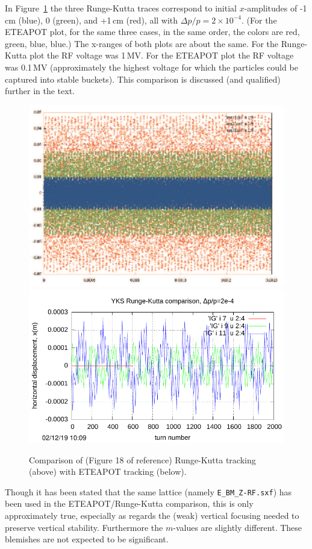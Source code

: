 \documentclass[12]{article}
\begin{document}
In Figure~\ref{fig:YKS-ETEAPOT-compare}
the three Runge-Kutta traces correspond
to initial $x$-amplitudes of -1\,cm (blue), 0 (green), and 
+1\,cm (red), all with $\Delta p/p=2\times10^{-4}$. 
(For the ETEAPOT plot, for the same three cases, in the same order, the 
colors are red, green, blue, blue.)
The x-ranges 
of both plots are about the same. For the Runge-Kutta plot
the RF voltage was 1\,MV. For the
ETEAPOT plot the RF voltage was 0.1\,MV
(approximately the highest voltage for which the
particles could be captured into stable buckets). This
comparison is discussed (and qualified) further in the text.
\begin{figure}[hbt]
\centering
\includegraphics[scale=0.4]{pdf/Yannis-RungeKutta.pdf}\\
\includegraphics[scale=0.8]{pdf/BM-IV_Figure5r.pdf}
\caption{\label{fig:YKS-ETEAPOT-compare}Comparison of
(Figure 18 of reference\cite{YKS-tracking}) 
Runge-Kutta tracking (above) with ETEAPOT tracking
(below). }
\end{figure}
Though it has been stated that the same lattice (namely {\tt E\_BM\_Z-RF.sxf})
has been used in the ETEAPOT/Runge-Kutta comparison, this is only approximately
true, especially as regards the (weak) vertical focusing needed to preserve
vertical stability. Furthermore the $m$-values are slightly different.
These blemishes are not expected to be significant.
\end{document}
